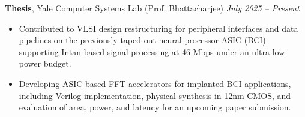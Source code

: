 \documentclass{article}
\begin{document}
\noindent\textbf{Thesis}, Yale Computer Systems Lab (Prof. Bhattacharjee) \hfill \textit{July 2025 – Present} 
\begin{itemize}[noitemsep, topsep=1pt]
    \item{} Contributed to VLSI design restructuring for peripheral interfaces and data pipelines on the previously taped-out neural-processor ASIC (BCI) supporting Intan-based signal processing at 46 Mbps under an ultra-low-power budget.
    \item{} Developing ASIC-based FFT accelerators for implanted BCI applications, including Verilog implementation, physical synthesis in 12nm CMOS, and evaluation of area, power, and latency for an upcoming paper submission.

\end{itemize} \vspace{0.7ex}


\end{document}
